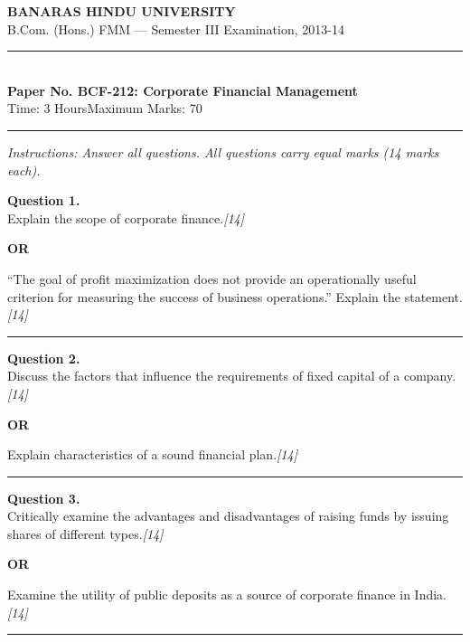 \documentclass[11pt,a4paper]{article}
\newcommand{\pts}[1]{\hfill   \textit{[#1]}}
\begin{document}
\begin{center}
  {\large\bfseries BANARAS HINDU UNIVERSITY}\\[2pt]
  {\normalsize B.Com. (Hons.) FMM --- Semester III Examination, 2013-14}\\[6pt]
  \rule{0.8\linewidth}{0.5pt}\\[6pt]
  {\large\bfseries Paper No. BCF-212: Corporate Financial Management}\\[4pt]
  {\normalsize Time: 3 Hours\hfill Maximum Marks: 70}
\end{center}

\rule{\linewidth}{0.4pt}

\smallskip



\noindent   \textit{Instructions: Answer all questions. All questions carry equal marks (14 marks each).}

\bigskip




\noindent   \textbf{Question 1.} \\
Explain the scope of corporate finance.\pts{14}

\centerline{   \textbf{OR}}

``The goal of profit maximization does not provide an operationally useful criterion for measuring the success of business operations.'' Explain the statement.\pts{14}

\medskip\rule{\linewidth}{0.2pt}




\noindent   \textbf{Question 2.} \\
Discuss the factors that influence the requirements of fixed capital of a company.\pts{14}

\centerline{   \textbf{OR}}

Explain characteristics of a sound financial plan.\pts{14}

\medskip\rule{\linewidth}{0.2pt}




\noindent   \textbf{Question 3.} \\
Critically examine the advantages and disadvantages of raising funds by issuing shares of different types.\pts{14}

\centerline{   \textbf{OR}}

Examine the utility of public deposits as a source of corporate finance in India.\pts{14}

\medskip\rule{\linewidth}{0.2pt}
\end{document}
